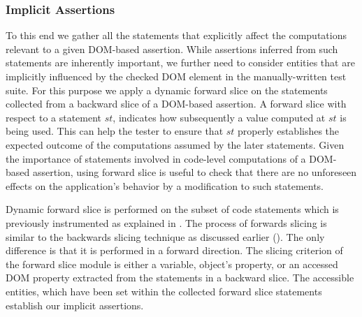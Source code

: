 \subsubsection{Implicit Assertions} \label{Sec:implicitAssertions}
To this end we gather all the statements that explicitly affect the computations relevant to a given DOM-based assertion. While assertions inferred from such statements are inherently important, we further need to consider entities that are implicitly influenced by the checked DOM element in the manually-written test suite. For this purpose we apply a dynamic forward slice on the statements collected from a backward slice of a DOM-based assertion. A forward slice with respect to a statement $st$,
indicates how subsequently a value computed at $st$ is being used. This can help the tester to ensure that $st$ properly establishes the expected outcome of the computations assumed by the later statements. 
Given the importance of statements involved in code-level computations of a DOM-based assertion, using forward slice is useful to check that there are no unforeseen effects on the application's behavior by a modification to such statements. 

Dynamic forward slice is performed on the subset of code statements which is previously instrumented as explained in . The process of forwards slicing is similar to the backwards slicing technique as discussed earlier (). The only difference is that it is performed in a forward direction. The slicing criterion of the forward slice module is either a variable, object's property, or an accessed DOM property extracted from the statements in a backward slice. The accessible entities, which have been set within the collected forward slice statements establish our implicit assertions.   
